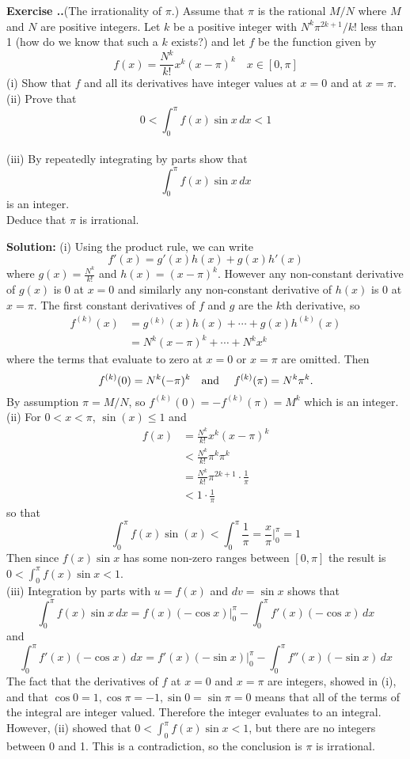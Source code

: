 \documentclass{article}
\newcounter{chapter}[section] %
\newcounter{example}[chapter]
\newcommand{\solution}[1]{\setlength{\hangindent}{\parindent} \indent\indent \textbf{Solution: }#1\hfill\break}
\newcommand{\exercise}[1]{
	
	\refstepcounter{example}
    \hangafter=1
    \setlength{\hangindent}{ 
    	\widthof{
			\large\textbf{Exercise \thesection.\thechapter.\theexample\enspace}
    	}-.5\parindent
    }
    {\setlength{\parindent}{0in}\large\textbf{Exercise \thesection.\thechapter.\theexample\enspace}#1}\hfill\break\par
}
\begin{document}
\exercise{(The irrationality of $\pi$.) Assume that $\pi$ is the rational $M/N$ where $M$ and $N$ are positive integers. Let $k$ be a positive integer with $N^k\pi^{2k+1}/k!$ less than 1 (how do we know that such a $k$ exists?) and let $f$ be the function given by 
$$f(x) = \frac{N^k}{k!} x^k(x-\pi)^k \quad x\in [0,\pi]$$
\indent (i) Show that $f$ and all its derivatives have integer values at $x=0$ and at $x=\pi$. \\
\indent (ii) Prove that $$0 < \int_0^\pi f(x)\sin x\, dx < 1$$ \\
\indent (iii) By repeatedly integrating by parts show that 
$$\int_0^\pi f(x)\sin x \, dx$$
is an integer.\\
\indent Deduce that $\pi$ is irrational. } %
\solution{(i) Using the product rule, we can write 
$$f'(x) = g'(x)h(x) + g(x)h'(x)$$
where $g(x) = \frac{N^k}{k!}$ and $h(x) = (x-\pi)^k$. However any non-constant derivative of $g(x)$ is 0 at $x = 0$ and similarly any non-constant derivative of $h(x)$ is 0 at $x=\pi$. The first constant derivatives of $f$ and $g$ are the $k$th derivative, so
\begin{align*}
f^{(k)}(x) &= g^{(k)}(x) h(x) + \dotsb + g(x)h^{(k)}(x) \\
&= N^k(x-\pi)^k + \dotsb + N^k x^k
\end{align*}
where the terms that evaluate to zero at $x=0$ or $x=\pi$ are omitted. Then 
$$f^{(k)}(0) = N^k(-\pi)^k \text{\quad and \quad} f^{(k)}(\pi) = N^k\pi^k.$$ 
\indent By assumption $\pi = M/N$, so $f^{(k)}(0) = - f^{(k)}(\pi) = M^k$ which is an integer. \\
\indent (ii) For $0 < x < \pi$, $\sin(x) \leq 1$ and 
\begin{align*}
f(x) &= \frac{N^k}{k!} x^k(x-\pi)^k \\
&< \frac{N^k}{k!} \pi^k \pi^k \\
&= \frac{N^k}{k!} \pi^{2k+1} \cdot \frac{1}{\pi} \\
&< 1 \cdot \frac{1}{\pi}
\end{align*} 
so that 
$$\int_0^\pi f(x)\sin(x) < \int_0^\pi\frac{1}{\pi} = \frac{x}{\pi}\Big\vert_0^\pi = 1 $$
\indent Then since $f(x)\sin x$ has some non-zero ranges between $[0,\pi]$ the result is $0 < \int_0^\pi f(x)\sin x < 1$. \\
\indent (iii) Integration by parts with $u = f(x)$ and $dv = \sin x$ shows that 
$$\int_0^\pi f(x)\sin x\, dx = f(x)(-\cos x) \Big\vert_0^\pi - \int_0^\pi f'(x)(-\cos x) \, dx$$
and 
$$\int_0^\pi f'(x)(-\cos x)\, dx = f'(x)(-\sin x)\Big\vert_0^\pi - \int_0^\pi f''(x)(-\sin x)\, dx$$
\indent The fact that the derivatives of $f$ at $x=0$ and $x=\pi$ are integers, showed in (i), and that $\cos0 = 1, \cos\pi = -1, \sin 0 = \sin \pi = 0$ means that all of the terms of the integral are integer valued. Therefore the integer evaluates to an integral. \\
\indent However, (ii) showed that $0 < \int_0^\pi f(x)\sin x < 1$, but there are no integers between 0 and 1. This is a contradiction, so the conclusion is $\pi$ is irrational.}%
\end{document}

